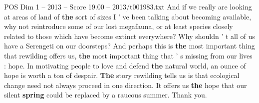 \begin{textsample}{POS Dim 1 – 2013 – Score 19.00 – 2013/t001983.txt}
And if we really are looking at areas of land of \textbf{the} sort of sizes I ' ve been talking about becoming available, why not reintroduce some of our lost megafauna, or at least species closely related to those which have become extinct everywhere?
Why shouldn ' t all of us have a Serengeti on our doorsteps?
And perhaps this is \textbf{the} most important thing that rewilding offers us, \textbf{the} most important thing that ' s missing from our lives : hope.
In motivating people to love and defend \textbf{the} natural world, an ounce of hope is worth a ton of despair. \textbf{The} story rewilding tells us is that ecological change need not always proceed in one direction.
It offers us \textbf{the} hope that our silent \textbf{spring} could be replaced by a raucous summer.
Thank you.

\end{textsample}
